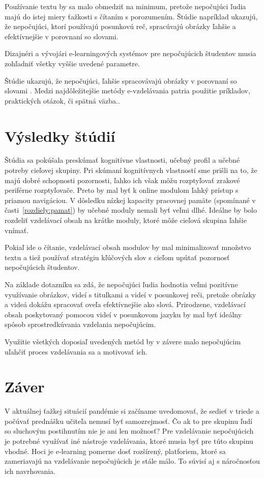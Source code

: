 \documentclass[10pt,oneside,slovak,a4paper]{article}
\begin{document}
Používanie textu by sa malo obmedziť na minimum, pretože nepočujúci ľudia majú do istej miery ťažkosti s čítaním s porozumením. Štúdie napríklad ukazujú, že nepočujúci, ktorí používajú posunkovú reč, spracúvajú obrázky ľahšie a efektívnejšie v porovnaní so slovami. 

Dizajnéri a vývojári e-learningových systémov pre nepočujúcich študentov musia zohľadniť všetky vyššie uvedené parametre. \par Štúdie ukazujú, že nepočujúci, ľahšie spracovávajú obrázky v porovnaní so slovami . Medzi  najdôležitejšie metódy e-vzdelávania patria použitie príkladov, praktických otázok, či spätná väzba.. \cite{pappas2018learning}

\section{Výsledky štúdií} \label{dolezitejsia}
Štúdia sa pokúšala preskúmať kognitívne vlastnosti, učebný profil a učebné potreby cieľovej skupiny.
Pri skúmaní kognitívnych vlastností sme prišli na to, že majú dobré schopnosti pozornosti, ľahko ich však môžu rozptyľovať zrakové periférne rozptyľovače. Preto by mal byť k online modulom ľahký prístup s priamou navigáciou. V dôsledku nízkej kapacity pracovnej pamäte (spomínané v časti~\ref{rozdiely:pamat}) by
učebné moduly nemali byť veľmi dlhé. Ideálne by bolo rozdeliť vzdelávací obsah na krátke moduly, ktoré môže cieľová skupina ľahšie vnímať. 

Pokiaľ ide o čítanie, vzdelávací obsah modulov by mal minimalizovať množstvo textu a tiež používať stratégiu kľúčových slov s cieľom upútať pozornosť nepočujúcich študentov.

Na základe dotazníku sa zdá, že nepočujúci ľudia hodnotia veľmi pozitívne využívanie obrázkov, videí s titulkami a videí v posunkovej reči, pretože obrázky a videá dokážu spracovať oveľa efektívnejšie ako slová. Prirodzene, vzdelávací obsah poskytovaný pomocou videí v posunkovom jazyku by mal byť ideálny spôsob sprostredkúvania vzdelania nepočujúcim.

Využitie všetkých doposiaľ uvedených metód by v závere malo nepočujúcim uľahčiť proces vzdelávania sa a motivovať ich\cite{pappas2018learning}.
\section{Záver} \label{zaver} 
V aktuálnej ťažkej situácií pandémie si začíname uvedomovať, že sedieť v triede a počúvať prednášku učiteľa nemusí byť samozrejmosť. Čo ak to pre skupinu ľudí so sluchovým postihnutím nie je ani len možnosť? Pre vzdelávanie nepočujúcich je potrebné využívať iné nástroje vzdelávania, ktoré musia byť pre túto skupinu vhodné. Hoci je e-learning pomerne dosť rozšírený, platforiem, ktoré sa zameriavajú na vzdelávanie nepočujúcich je stále málo. To súvisí aj s náročnosťou ich navrhovania.
\end{document}
